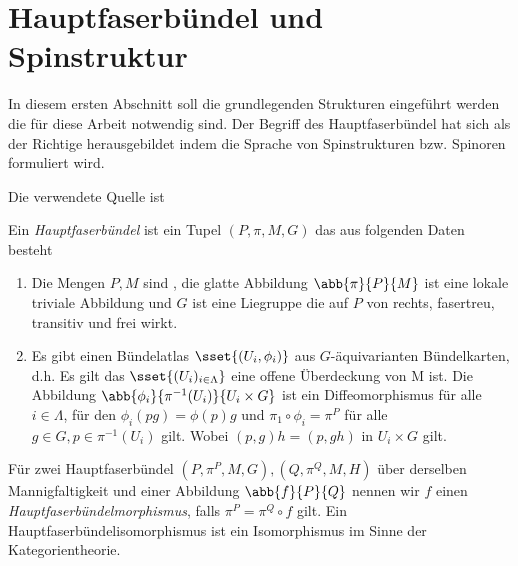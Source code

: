 

\section{Hauptfaserbündel und Spinstruktur}

In diesem ersten Abschnitt soll die grundlegenden Strukturen
eingeführt werden die für diese Arbeit notwendig sind. Der Begriff des
Hauptfaserbündel hat sich als der Richtige herausgebildet indem die
Sprache von Spinstrukturen bzw. Spinoren formuliert wird.

Die verwendete Quelle ist \cite{baum09}

\begin{Def}[Hauptfaserbündel]
  Ein \textit{Hauptfaserbündel} ist ein Tupel $(P,\pi,M,G)$ das aus
  folgenden Daten besteht
	\begin{enumerate}[\textbullet]
        \item Die Mengen $P,M$ sind \mfgen, die glatte Abbildung
          $ \abb{\pi}{P}{M} $ ist eine lokale triviale Abbildung und
          $G$ ist eine Liegruppe die auf $P$ von rechts, fasertreu,
          transitiv und frei wirkt.   
        \item Es gibt einen Bündelatlas $\sset{(U_i,\phi_i)}$ aus
          $G$-äquivarianten Bündelkarten, d.h.  Es gilt das
          $\sset{(U_i)_{i \in \Lambda}}$ eine offene Überdeckung von M
          ist. Die Abbildung
          $ \abb{\phi_i}{\pi^{-1}(U_i)}{U_i\times G} $ ist ein
          Diffeomorphismus für alle $i \in \Lambda $, für den
          $ \phi_i(pg) = \phi(p) g $ und
          $ \pi_1 \circ \phi_i = \pi^P $ für alle
          $ g \in G, p \in \pi^{-1}(U_i) $ gilt. Wobei
          $ (p,g) h = (p,gh) $ in $ U_i\times G $ gilt.
	\end{enumerate}		
	Für zwei Hauptfaserbündel $(P,\pi^P,M,G),(Q,\pi^Q,M,H)$ über
        derselben Mannigfaltigkeit und einer Abbildung $\abb{f}{P}{Q}$
        nennen wir $f$ einen \textit{Hauptfaserbündelmorphismus},
        falls $ \pi^P=\pi^Q \circ f $ gilt. Ein
        Hauptfaserbündelisomorphismus ist ein Isomorphismus im Sinne
        der Kategorientheorie.
\end{Def}

